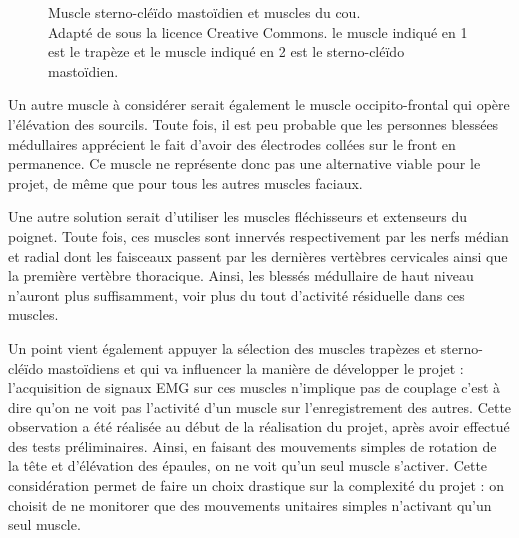 \documentclass[letterpaper, twoside, 12pt, memoire, creativecommons, hyperref]{thETS}
\begin{document}
\begin{figure}
	\centering
	\caption{Muscle sterno-cléïdo mastoïdien et muscles du cou. \\Adapté de \cite{sternoWiki} sous la licence Creative Commons. le muscle indiqué en 1 est le trapèze et le muscle indiqué en 2 est le sterno-cléïdo mastoïdien.}
	\label{fig:muscles}
\end{figure}


Un autre muscle à considérer serait également le muscle occipito-frontal qui opère l'élévation des sourcils. Toute fois, il est peu probable que les personnes blessées médullaires apprécient le fait d'avoir des électrodes collées sur le front en permanence. Ce muscle ne représente donc pas une alternative viable pour le projet, de même que pour tous les autres muscles faciaux.

Une autre solution serait d'utiliser les muscles fléchisseurs et extenseurs du poignet. Toute fois, ces muscles sont innervés respectivement par les nerfs médian et radial dont les faisceaux passent par les dernières vertèbres cervicales ainsi que la première vertèbre thoracique. Ainsi, les blessés médullaire de haut niveau n'auront plus suffisamment, voir plus du tout d'activité résiduelle dans ces muscles.

Un point vient également appuyer la sélection des muscles trapèzes et sterno-cléïdo mastoïdiens et qui va influencer la manière de développer le projet : l'acquisition de signaux EMG sur ces muscles n'implique pas de couplage c'est à dire qu'on ne voit pas l'activité d'un muscle sur l'enregistrement des autres. Cette observation a été réalisée au début de la réalisation du projet, après avoir effectué des tests préliminaires. Ainsi, en faisant des mouvements simples de rotation de la tête et d'élévation des épaules, on ne voit qu'un seul muscle s'activer. Cette considération permet de faire un choix drastique sur la complexité du projet : on choisit de ne monitorer que des mouvements unitaires simples n'activant qu'un seul muscle. 
\end{document}

